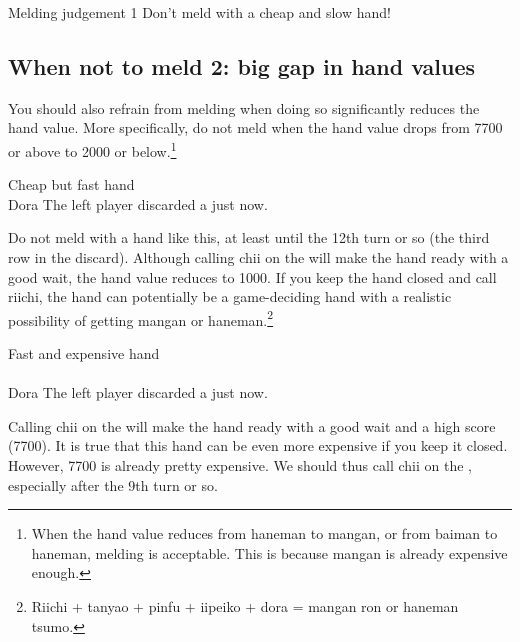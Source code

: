 \bigskip
\begin{itembox}[c]{Melding judgement 1}
Don't meld with a cheap and slow hand!
\end{itembox}

\bigskip
\subsection{When not to meld 2: big gap in hand values}
You should also refrain from melding when doing so significantly reduces the hand value. More specifically, do not meld when the hand value drops from 7700 or above to 2000 or below.\footnote{When the hand value reduces from {\jap haneman} to {\jap mangan}, or from {\jap baiman} to {\jap haneman}, melding is acceptable. This is because {\jap mangan} is already expensive enough.} 

\bigskip
\begin{itembox}[r]{Cheap but fast hand}
\bp
{}~~\\
\hspace{295pt}\footnotesize{\jap Dora}
\ep
\vspace{-20pt}The left player discarded a {\large{}} just now.
\end{itembox}
\noindent
Do not meld with a hand like this, at least until the 12th turn or so (the third row in the discard). Although calling {\jap chii} on the {\large{}} will make the hand ready with a good wait, the hand value reduces to 1000. 
If you keep the hand closed and call {\jap riichi}, the hand can potentially be a game-deciding hand with a realistic possibility of getting {\jap mangan} or {\jap haneman}.\footnote{{\jap Riichi} + {\jap tanyao + pinfu + iipeiko + dora} = {\jap mangan ron} or {\jap haneman tsumo}.} 

\bigskip
\begin{itembox}[r]{Fast and expensive hand}
\bp
{}\\ \vspace{-18pt}
\rfw{}~~\\
\hspace{295pt}\footnotesize{\jap Dora}
\ep
\vspace{-20pt}The left player discarded a {\large{}} just now.
\end{itembox}
\noindent
Calling {\jap chii} on the {\large{}} will make the hand ready with a good wait and a high score (7700). It is true that this hand can be even more expensive if you keep it closed. However, 7700 is already pretty expensive. We should thus call {\jap chii} on the {\large{}}, especially after the 9th turn or so. 

